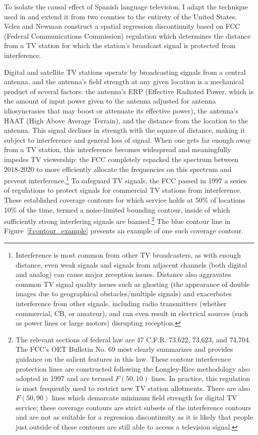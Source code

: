 \documentclass[11pt]{article}
\begin{document}
To isolate the causal effect of Spanish language television, I adapt the technique used in \cite{velez_tuning_2019}  and extend it from two counties to the entirety of the United States. Velez and Newman construct a spatial regression discontinuity based on FCC (Federal Communications Commission) regulation which determines the distance from a TV station for which the station's broadcast signal is protected from interference.

Digital and satellite TV stations operate by broadcasting signals from a central antenna, and the antenna's field strength at any given location is a mechanical product of several factors: the antenna's ERP (Effective Radiated Power, which is the amount of input power given to the antenna adjusted for antenna idiosyncrasies that may boost or attenuate its effective power), the antenna's HAAT (High Above Average Terrain), and the distance from the location to the antenna. This signal declines in strength with the square of distance, making it subject to interference and general loss of signal. When one gets far enough away from a TV station, this interference becomes widespread and meaningfully impedes TV viewership: the FCC completely repacked the spectrum between 2018-2020 to more efficiently allocate the frequencies on this spectrum and prevent interference.\footnote{ Interference is most common from other TV broadcasters, as with enough distance, even weak signals and signals from adjacent channels (both digital and analog) can cause major reception issues. Distance also aggravates common TV signal quality issues such as ghosting (the appearance of double images due to geographical obstacles/multiple signals) and exacerbates interference from other signals, including radio transmitters (whether commercial, CB, or amateur), and can even result in electrical sources (such as power lines or large motors) disrupting reception.} To safeguard TV signals, the FCC passed in 1997 a series of regulations to protect signals for commercial TV stations from interference. These established coverage contours for which service holds at 50\% of locations 10\% of the time, termed a noise-limited bounding contour, inside of which sufficiently strong interfering signals are banned.\footnote{ The relevant sections of federal law are 47 C.F.R. 73.622, 73.623, and 74.704. The FCC's OET Bulletin No. 69 most clearly summarizes and provides guidance on the salient features in this law. These contour interference protection lines are constructed following the Longley-Rice methodology also adopted in 1997 and are termed $F(50,10)$ lines. In practice, this regulation is most frequently used to restrict new TV station allotments. There are also $F(50,90)$ lines which demarcate minimum field strength for digital TV service; these coverage contours are strict subsets of the interference contours and are not as suitable for a regression discontinuity as it is likely that people just outside of these contours are still able to access a television signal.} The blue contour line in Figure~\ref{f:contour_example} presents an example of one such coverage contour.
\end{document}
